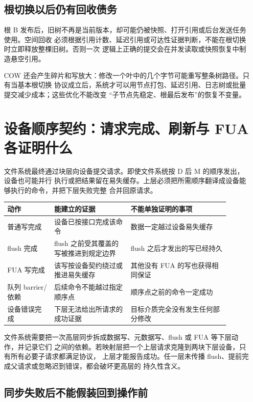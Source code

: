\subsection{根切换以后仍有回收债务}

根 B 发布后，旧树不再是当前版本，却可能仍被快照、打开引用或后台发送任务使用。空间回收
必须根据引用计数、延迟引用或可达性证据判断，不能在根切换时立即释放整棵旧树。否则一次
逻辑上正确的提交会在并发读取或快照恢复中制造悬空引用。

COW 还会产生碎片和写放大：修改一个叶中的几个字节可能重写整条树路径。只有当基本根切换
协议成立后，系统才可以用节点打包、延迟引用、日志树或批量提交减少成本；这些优化不能改变
“子节点先稳定、根最后发布”的恢复不变量。

\section{设备顺序契约：请求完成、刷新与 FUA 各证明什么}

文件系统最终通过块层向设备提交请求。即使文件系统按 D 后 M 的顺序发出，设备也可能并行
执行或把结果留在易失缓存。上层必须把所需顺序翻译成设备能够执行的命令，并把下层失败完整
合并回原请求。

\begin{longtable}{|L{0.19\linewidth}|L{0.31\linewidth}|L{0.4\linewidth}|}
\hline
动作 & 能建立的证据 & 不能单独证明的事项 \\ \hline
普通写完成 & 设备已按接口完成该命令 & 数据一定越过设备易失缓存 \\\tablerowrule
flush 完成 & flush 之前受其覆盖的写被推进到规定边界 &
flush 之后才发出的写已经持久 \\\tablerowrule
FUA 写完成 & 该写按设备契约绕过或推进易失缓存 &
其他没有 FUA 的写也获得相同保证 \\\tablerowrule
队列 barrier/依赖 & 后续命令不能越过指定顺序点 &
顺序点之前的命令一定成功 \\\tablerowrule
设备错误完成 & 下层无法给出所请求的成功证据 &
目标介质完全没有发生任何部分修改 \\
\hline
\end{longtable}

文件系统需要把一次高层同步拆成数据写、元数据写、flush 或 FUA 等下层动作，并记录它们
之间的依赖。若映射层把一个上层请求克隆到两块下层设备，只有所有必要子请求都满足协议，
上层才能报告成功。任一层未传播 flush、提前完成父请求或忽略迟到错误，都会破坏更高层的
持久性含义。

\subsection{同步失败后不能假装回到操作前}

